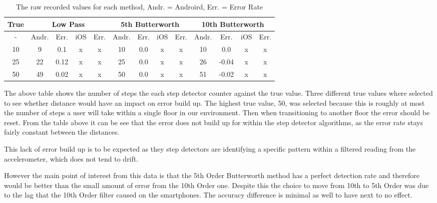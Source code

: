 \documentclass[main.tex]{subfiles}
\begin{document}


\begin{table}[ht]
	\begin{tabular}{| c || c | c | c | c | c | c | c | c | c | c | c | c |}
		\hline
		True & \multicolumn{4}{|c|}{Low Pass} & \multicolumn{4}{|c|}{5th Butterworth} & \multicolumn{4}{|c|}{10th Butterworth} \\
		\hline
		 - & Andr. & Err. & iOS & Err. & Andr. & Err. & iOS & Err. & Andr. & Err. & iOS & Err.\\
		\hline
		10 & 9 & 0.1 & x & x & 10 & 0.0 & x & x & 10 & 0.0 & x & x\\ 		
		25 & 22 & 0.12 & x & x & 25 & 0.0 & x & x & 26 & -0.04 & x & x \\ 	
		50 & 49 & 0.02 & x & x & 50 & 0.0 & x & x & 51 & -0.02 & x & x\\ 
		\hline	
	\end{tabular}
	\caption{The raw recorded values for each method, Andr. = Androird, Err. = Error Rate}
\end{table}

The above table shows the number of steps the each step detector counter against the true value. Three different true values where selected to see whether distance would have an impact on error build up. The highest true value, 50, was selected because this is roughly at most the number of steps a user will take within a single floor in our environment. Then when transitioning to another floor the error should be reset. From the table above it can be see that the error does not build up for within the step detector algorithms, as the error rate stays fairly constant between the distances. 

This lack of error build up is to be expected as they step detectors are identifying a specific pattern within a filtered reading from the accelerometer, which does not tend to drift.

However the main point of interest from this data is that the 5th Order Butterworth method has a perfect detection rate and therefore would be better than the small amount of error from the 10th Order one. Despite this the choice to move from 10th to 5th Order was due to the lag that the 10th Order filter caused on the smartphones. The accuracy difference is minimal as well to have next to no effect. 
\end{document}
